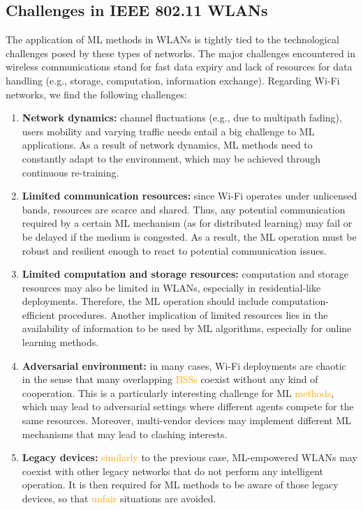 \documentclass[journal]{IEEEtran}
\begin{document}
\subsection{Challenges in IEEE 802.11 WLANs}
\label{section:ieee_80211_wlans}
The application of ML methods in WLANs is tightly tied to the technological challenges posed by these types of networks. The major challenges encountered in wireless communications stand for fast data expiry and lack of resources for data handling (e.g., storage, computation, information exchange). Regarding Wi-Fi networks, we find the following challenges:
\begin{enumerate}
	\item \textbf{Network dynamics:} channel fluctuations (e.g., due to multipath fading), users mobility and varying traffic needs entail a big challenge to ML applications. As a result of network dynamics, ML methods need to constantly adapt to the environment, which may be achieved through continuous re-training.
	\item \textbf{Limited communication resources:} since Wi-Fi operates under unlicensed bands, resources are scarce and shared. Thus, any potential communication required by a certain ML mechanism (as for distributed learning) may fail or be delayed if the medium is congested. As a result, the ML operation must be robust and resilient enough to react to potential communication issues.
	\item \textbf{Limited computation and storage resources:} computation and storage resources may also be limited in WLANs, especially in residential-like deployments. Therefore, the ML operation should include computation-efficient procedures. Another implication of limited resources lies in the availability of information to be used by ML algorithms, especially for online learning methods.
	\item \textbf{Adversarial environment:} in many cases, Wi-Fi deployments are chaotic in the sense that many overlapping \textcolor{orange}{BSSs} coexist without any kind of cooperation. This is a particularly interesting challenge for ML \textcolor{orange}{methods}, which may lead to adversarial settings where different agents compete for the same resources. Moreover, multi-vendor devices may implement different ML mechanisms that may lead to clashing interests.
	\item \textbf{Legacy devices:} \textcolor{orange}{similarly} to the previous case, ML-empowered WLANs may coexist with other legacy networks that do not perform any intelligent operation. It is then required for ML methods to be aware of those legacy devices, so that \textcolor{orange}{unfair} situations are avoided.
\end{enumerate}
\end{document}
